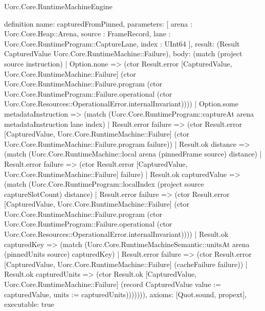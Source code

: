 \begin{lexlean}{Uorc.Core.RuntimeMachineEngine}
\begin{semanticmodule}
definition{
  name: capturedFromPinned,
  parameters: [
    arena : Uorc.Core.Heap::Arena,
    source : FrameRecord,
    lane : Uorc.Core.RuntimeProgram::CaptureLane,
    index : UInt64
  ],
  result: (Result CapturedValue Uorc.Core.RuntimeMachine::Failure),
  body: (match (project source instruction)
    | Option.none => (ctor Result.error [CapturedValue, Uorc.Core.RuntimeMachine::Failure] (ctor Uorc.Core.RuntimeMachine::Failure.program (ctor Uorc.Core.RuntimeProgram::Failure.operational (ctor Uorc.Core.Resources::OperationalError.internalInvariant))))
    | Option.some metadataInstruction => (match (Uorc.Core.RuntimeProgram::captureAt arena metadataInstruction lane index)
      | Result.error failure => (ctor Result.error [CapturedValue, Uorc.Core.RuntimeMachine::Failure] (ctor Uorc.Core.RuntimeMachine::Failure.program failure))
      | Result.ok distance => (match (Uorc.Core.RuntimeMachine::local arena (pinnedFrame source) distance)
        | Result.error failure => (ctor Result.error [CapturedValue, Uorc.Core.RuntimeMachine::Failure] failure)
        | Result.ok capturedValue => (match (Uorc.Core.RuntimeProgram::localIndex (project source captureSlotCount) distance)
          | Result.error failure => (ctor Result.error [CapturedValue, Uorc.Core.RuntimeMachine::Failure] (ctor Uorc.Core.RuntimeMachine::Failure.program (ctor Uorc.Core.RuntimeProgram::Failure.operational (ctor Uorc.Core.Resources::OperationalError.internalInvariant))))
          | Result.ok capturedKey => (match (Uorc.Core.RuntimeMachineSemantic::unitsAt arena (pinnedUnits source) capturedKey)
            | Result.error failure => (ctor Result.error [CapturedValue, Uorc.Core.RuntimeMachine::Failure] (cacheFailure failure))
            | Result.ok capturedUnits => (ctor Result.ok [CapturedValue, Uorc.Core.RuntimeMachine::Failure] (record CapturedValue {value := capturedValue, units := capturedUnits}))))))),
  axioms: [Quot.sound, propext],
  executable: true
}


\end{semanticmodule}
\end{lexlean}

